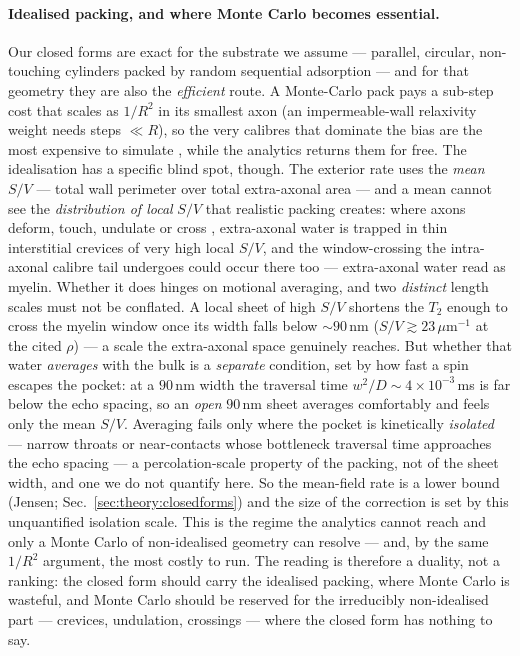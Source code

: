 \paragraph{Idealised packing, and where Monte Carlo becomes essential.} Our closed forms
are exact for the substrate we assume --- parallel, circular, non-touching cylinders packed
by random sequential adsorption --- and for that geometry they are also the \emph{efficient}
route. A Monte-Carlo pack pays a sub-step cost that scales as $1/R^2$ in its smallest axon
(an impermeable-wall relaxivity weight needs steps $\ll R$), so the very calibres that
dominate the bias are the most expensive to simulate \citep{Hall2009}, while the analytics
returns them for free. The idealisation has a specific blind spot,
though. The exterior rate uses the \emph{mean} $S/V$ --- total wall perimeter over total
extra-axonal area --- and a mean cannot see the \emph{distribution of local} $S/V$ that
realistic packing creates: where axons deform, touch, undulate or cross \citep{Xu2018},
extra-axonal water is trapped in thin interstitial crevices of very high local $S/V$, and
the window-crossing the intra-axonal calibre tail undergoes could occur there too ---
extra-axonal water read as myelin. Whether it does hinges on motional averaging, and two
\emph{distinct} length scales must not be conflated. A local sheet of high $S/V$ shortens the
$T_2$ enough to cross the myelin window once its width falls below
${\sim}90$\,nm ($S/V\gtrsim23\,\mu$m$^{-1}$ at the cited $\rho$) --- a scale the extra-axonal
space genuinely reaches. But whether that water \emph{averages} with the bulk is a
\emph{separate} condition, set by how fast a spin escapes the pocket: at a $90$\,nm width the
traversal time $w^2/D\!\sim\!4\times10^{-3}$\,ms is far below the echo spacing, so an
\emph{open} $90$\,nm sheet averages comfortably and feels only the mean $S/V$. Averaging fails
only where the pocket is kinetically \emph{isolated} --- narrow throats or near-contacts whose
bottleneck traversal time approaches the echo spacing --- a percolation-scale property of the
packing, not of the sheet width, and one we do not quantify here. So the mean-field rate is a
lower bound (Jensen; Sec.~\ref{sec:theory:closedforms}) and the size of the correction is set by
this unquantified isolation scale. This is the regime the analytics cannot reach and only a
Monte Carlo of non-idealised geometry can resolve --- and, by the same $1/R^2$ argument, the
most costly to run. The reading is therefore a duality, not a ranking: the closed form should carry the
idealised packing, where Monte Carlo is wasteful, and Monte Carlo should be reserved for the
irreducibly non-idealised part --- crevices, undulation, crossings --- where the closed form
has nothing to say.

